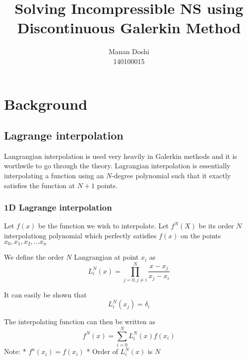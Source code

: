 \documentclass[11pt]{article}
\title{Solving Incompressible NS using Discontinuous Galerkin Method}
\author{Manan Doshi \\ 140100015}
\begin{document}
    
    
    \maketitle
    \tableofcontents
    \newpage
    

    

    \section{Background}\label{background}

\subsection{Lagrange interpolation}\label{lagrange-interpolation}

Langrangian interpolation is used very heavily in Galerkin methods and
it is worthwile to go through the theory. Lagrangian interpolation is
essentially interpolating a function using an \(N\)-degree polynomial
such that it exactly satisfies the function at \(N+1\) points.

\subsubsection{1D Lagrange
interpolation}\label{d-lagrange-interpolation}

Let \(f(x)\) be the function we wish to interpolate. Let \(f^N(X)\) be
its order \(N\) interpolationg polynomial which perfectly satisfies
\(f(x)\) on the points \(x_0, x_1, x_2, ... x_n\)

We define the order \(N\) Langrangian at point \(x_i\) as
\[L^N_i(x) = \prod_{j=0, j\neq i}^{N} \frac{x-x_j}{x_j-x_i}\]

It can easily be shown that \[L^N_i(x_j) = \delta_{i}\]

The interpolating function can then be written as
\[f^N(x) = \sum_{i=0}^{N}L_i^N(x)f(x_i)\] Note: * \(f^n(x_i) = f(x_i)\)
* Order of \(L_i^N(x)\) is \(N\)



    \begin{center}
    \end{center}
    { \hspace*{\fill} \\}
    
\end{document}
